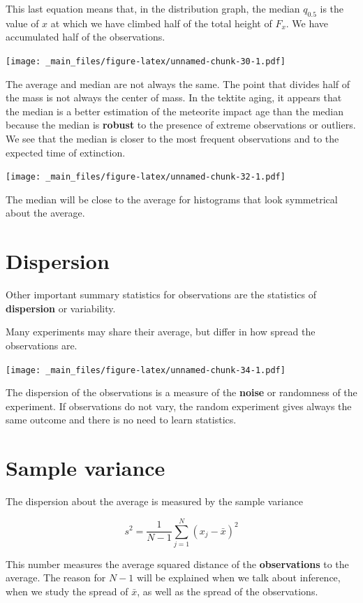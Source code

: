 \documentclass[
]{book}
\begin{document}
This last equation means that, in the distribution graph, the median \(q_{ 0.5}\) is the value of \(x\) at which we have climbed half of the total height of \(F_x\). We have accumulated half of the observations.

\texttt{[image: \_main\_files/figure-latex/unnamed-chunk-30-1.pdf]}

The average and median are not always the same. The point that divides half of the mass is not always the center of mass. In the tektite aging, it appears that the median is a better estimation of the meteorite impact age than the median because the median is \textbf{robust} to the presence of extreme observations or outliers. We see that the median is closer to the most frequent observations and to the expected time of extinction.

\texttt{[image: \_main\_files/figure-latex/unnamed-chunk-32-1.pdf]}

The median will be close to the average for histograms that look symmetrical about the average.

\hypertarget{dispersion}{%
\section{Dispersion}\label{dispersion}}

Other important summary statistics for observations are the statistics of \textbf{dispersion} or variability.

Many experiments may share their average, but differ in how spread the observations are.

\texttt{[image: \_main\_files/figure-latex/unnamed-chunk-34-1.pdf]}

The dispersion of the observations is a measure of the \textbf{noise} or randomness of the experiment. If observations do not vary, the random experiment gives always the same outcome and there is no need to learn statistics.

\hypertarget{sample-variance}{%
\section{Sample variance}\label{sample-variance}}

The dispersion about the average is measured by the sample variance

\[s^2=\frac{ 1}{ N-1} \sum_{j=1}^N ( x_j -\bar{x})^2\]

This number measures the average squared distance of the \textbf{observations} to the average. The reason for \(N-1\) will be explained when we talk about inference, when we study the spread of \(\bar{x}\), as well as the spread of the observations.
\end{document}
